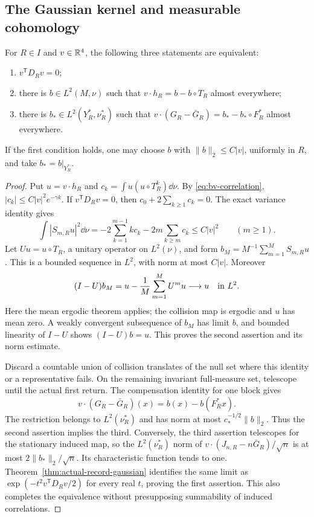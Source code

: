 \subsection{The Gaussian kernel and measurable cohomology}
\begin{theorem}
\label{thm:gaussian-kernel-coboundary}
For $R\in I$ and $v\in\mathbb R^4$, the following three statements are
equivalent:
\begin{enumerate}
\item $v^{\mathsf T}D_Rv=0$;
\item there is $b\in L^2(M,\nu)$ such that
 $v\cdot h_R=b-b\circ T_R$ almost everywhere;
\item there is $b_*\in L^2(Y_R^*,\nu_R^*)$ such that
 $v\cdot(G_R-\bar G_R)=b_*-b_*\circ F_R^*$ almost everywhere.
\end{enumerate}
If the first condition holds, one may choose $b$ with
$\|b\|_2\le C|v|$, uniformly in $R$, and take $b_*=b|_{Y_R^*}$.
\end{theorem}
\begin{proof}
Put $u=v\cdot h_R$ and $c_k=\int u(u\circ T_R^k)\dd\nu$.
By \eqref{eq:bv-correlation}, $|c_k|\le C|v|^2e^{-\gamma k}$.
If $v^{\mathsf T}D_Rv=0$, then $c_0+2\sum_{k\ge1}c_k=0$.
The exact variance identity gives
\[
 \int|S_{m,R}u|^2\dd\nu
       =-2\sum_{k=1}^{m-1}k c_k-2m\sum_{k\ge m}c_k
       \le C|v|^2 \qquad(m\ge1).
\]
Let $Uu=u\circ T_R$, a unitary operator on $L^2(\nu)$, and form
$b_M=M^{-1}\sum_{m=1}^M S_{m,R}u$. This is a bounded sequence in
$L^2$, with norm at most $C|v|$. Moreover
\[
 (I-U)b_M=u-\frac1M\sum_{m=1}^M U^m u\longrightarrow u
       \quad\hbox{in }L^2.
\]
Here the mean ergodic theorem applies; the collision map is ergodic
and $u$ has mean zero. A weakly convergent subsequence of $b_M$ has
limit $b$, and bounded linearity of $I-U$ shows $(I-U)b=u$.
This proves the second assertion and its norm estimate.

Discard a countable union of collision translates of the null set
where this identity or a representative fails. On the remaining
invariant full-measure set, telescope until the actual first return.
The compensation identity for one block gives
\[
 v\cdot(G_R-\bar G_R)(x)=b(x)-b(F_R^*x).
\]
The restriction belongs to $L^2(\nu_R^*)$ and has norm at most
$c_*^{-1/2}\|b\|_2$. Thus the second assertion implies the third.
Conversely, the third assertion telescopes for the stationary induced
map, so the $L^2(\nu_R^*)$ norm of
$v\cdot(J_{n,R}-n\bar G_R)/\sqrt n$ is at most
$2\|b_*\|_2/\sqrt n$. Its characteristic function tends to one.
Theorem~\ref{thm:actual-record-gaussian} identifies the same limit as
$\exp(-t^2v^{\mathsf T}D_Rv/2)$ for every real $t$, proving the first
assertion. This also completes the equivalence without presupposing
summability of induced correlations.
\end{proof}

